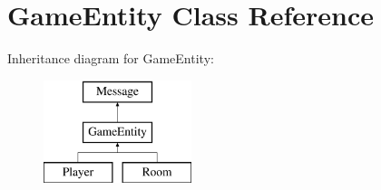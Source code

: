 \hypertarget{class_game_entity}{}\section{Game\+Entity Class Reference}
\label{class_game_entity}
Inheritance diagram for Game\+Entity\+:\begin{figure}[H]
\begin{center}
\leavevmode
\includegraphics[height=3.000000cm]{class_game_entity}
\end{center}
\end{figure}

